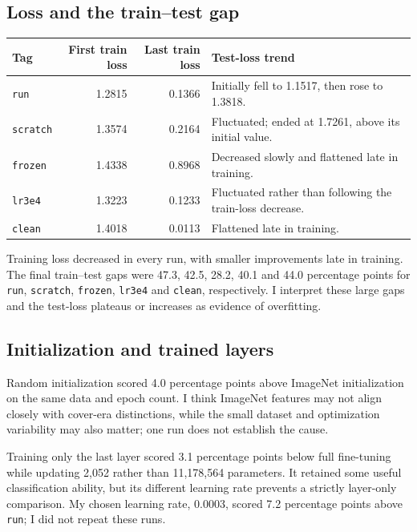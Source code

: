 \documentclass[11pt]{article}
\begin{document}
\subsection*{Loss and the train--test gap}
\begin{center}\small
\begin{tabular}{lrrp{6.1cm}}\toprule
Tag & First train loss & Last train loss & Test-loss trend\\\midrule
\texttt{run}&1.2815&0.1366&Initially fell to 1.1517, then rose to 1.3818.\\
\texttt{scratch}&1.3574&0.2164&Fluctuated; ended at 1.7261, above its initial value.\\
\texttt{frozen}&1.4338&0.8968&Decreased slowly and flattened late in training.\\
\texttt{lr3e4}&1.3223&0.1233&Fluctuated rather than following the train-loss decrease.\\
\texttt{clean}&1.4018&0.0113&Flattened late in training.\\\bottomrule
\end{tabular}
\end{center}
Training loss decreased in every run, with smaller improvements late in training. The final train--test gaps were 47.3, 42.5, 28.2, 40.1 and 44.0 percentage points for \texttt{run}, \texttt{scratch}, \texttt{frozen}, \texttt{lr3e4} and \texttt{clean}, respectively. I interpret these large gaps and the test-loss plateaus or increases as evidence of overfitting.

\subsection*{Initialization and trained layers}
Random initialization scored 4.0 percentage points above ImageNet initialization on the same data and epoch count. I think ImageNet features may not align closely with cover-era distinctions, while the small dataset and optimization variability may also matter; one run does not establish the cause.

Training only the last layer scored 3.1 percentage points below full fine-tuning while updating 2,052 rather than 11,178,564 parameters. It retained some useful classification ability, but its different learning rate prevents a strictly layer-only comparison. My chosen learning rate, 0.0003, scored 7.2 percentage points above \texttt{run}; I did not repeat these runs.
\end{document}
